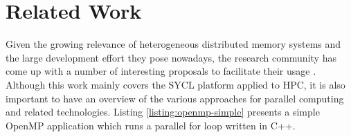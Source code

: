 %
%
%

\cleardoublepage
\chapter{Related Work} \label{chap:Related_Technologies}

Given the growing relevance of heterogeneous distributed memory systems and the large
development effort they pose nowadays, the research community has come up with a number of
interesting proposals to facilitate their usage \cite{Agullo:2017:Achieving, Sainz:2014:Leveraging,Lawlor:2009:Message,Stone:2010:OpenCL,Kim:2012:SnuCL}.
Although this work mainly covers the SYCL platform applied to HPC, it is also important to have an overview of the various approaches for parallel computing and related technologies.
Listing \ref{listing:openmp-simple} presents a simple OpenMP application which runs a parallel for loop written in C++.




